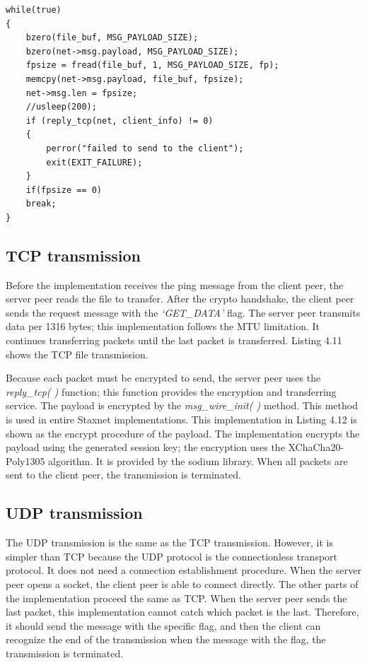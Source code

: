 \lstset{language=C} 
\begin{lstlisting}[caption=The TCP file transmission]
while(true)
{
	bzero(file_buf, MSG_PAYLOAD_SIZE);
	bzero(net->msg.payload, MSG_PAYLOAD_SIZE);
	fpsize = fread(file_buf, 1, MSG_PAYLOAD_SIZE, fp);
	memcpy(net->msg.payload, file_buf, fpsize);
	net->msg.len = fpsize;
	//usleep(200);
	if (reply_tcp(net, client_info) != 0)
	{
		perror("failed to send to the client");
		exit(EXIT_FAILURE);
	}
	if(fpsize == 0)
	break;
}

\end{lstlisting}

\subsection{TCP transmission}

Before the implementation receives the ping message from the client peer, the server peer reads the file to transfer. After the crypto handshake, the client peer sends the request message with the \textit{‘GET\_DATA’} flag. The server peer transmits data per 1316 bytes; this implementation follows the MTU limitation. It continues transferring packets until the last packet is transferred. Listing 4.11 shows the TCP file transmission.

Because each packet must be encrypted to send, the server peer uses the \textit{reply\_tcp( )} function; this function provides the encryption and transferring service. The payload is encrypted by the \textit{msg\_wire\_init( )} method. This method is used in entire Staxnet implementations. This implementation in Listing 4.12 is shown as the encrypt procedure of the payload. The implementation encrypts the payload using the generated session key; the encryption uses the XChaCha20-Poly1305 algorithm. It is provided by the sodium library.
When all packets are sent to the client peer, the transmission is terminated.

\subsection{UDP transmission}

The UDP transmission is the same as the TCP transmission. However, it is simpler than TCP because the UDP protocol is the connectionless transport protocol. It does not need a connection establishment procedure. When the server peer opens a socket, the client peer is able to connect directly. The other parts of the implementation proceed the same as TCP. When the server peer sends the last packet, this implementation cannot catch which packet is the last. Therefore, it should send the message with the specific flag, and then the client can recognize the end of the transmission when the message with the flag, the transmission is terminated.

